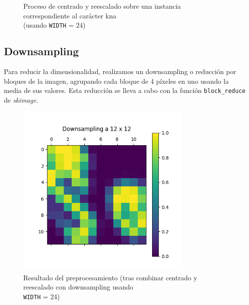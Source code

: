 \documentclass[a4]{article}
\begin{document}
\begin{figure}[H]
  \caption{Proceso de centrado y reescalado sobre una instancia correspondiente al carácter kna\\ (usando \texttt{WIDTH} = 24)}
  \label{fig:centerAndResize}
\end{figure}

\subsection{Downsampling}

Para reducir la dimensionalidad, realizamos un downsampling o
reducción por bloques de la imagen, agrupando cada bloque de 4
píxeles en uno usando la media de sus valores. Esta reducción se lleva
a cabo con la función \texttt{block\_reduce} de \textit{skimage}.

\begin{figure}[H]
  \centering
  \includegraphics[width=87mm]{imgs/downsampling.png}
  \caption{Resultado del preprocesamiento (tras combinar centrado y reescalado con downsampling usando\\ \texttt{WIDTH} = 24)}
  \label{fig:downsampling}
\end{figure}
\end{document}
